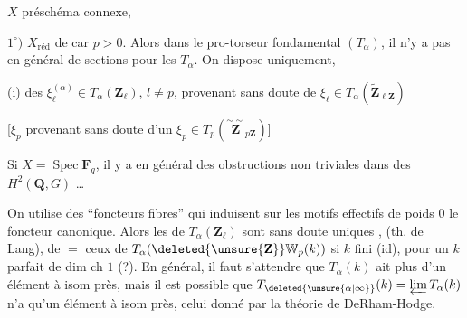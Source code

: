 $X$ préschéma connexe, 

$1^\circ)$ $X_{\mathrm{réd}}$ de car $p>0$. Alors dans le pro-torseur fondamental $(T_\alpha)$, il n'y a pas en général de sections pour les $T_\alpha$.  On dispose uniquement, 

(i) des $\xi_{\ell}^{(\alpha)}\in T_\alpha(\mathbf Z_{\ell})$, $l\ne p$, provenant sans doute de $\xi_{\ell}\in T_\alpha(\widetilde{\mathbf Z}_{\ell\mathbf Z})$


[$\xi_p$ provenant sans doute d'un $\xi_p\in T_p(\overset{\sim\!\sim}{\mathbf Z}_{p\mathbf Z})$]

Si $X=\operatorname{Spec}\mathbf F_q$, il y a en général des  obstructions non triviales dans des $H^2(\mathbf Q,G)$ \ldots

 On utilise des ``foncteurs fibres'' qui induisent sur les motifs effectifs de poids $0$ le foncteur canonique. Alors les  de $T_\alpha(\mathbf Z_\ell)$ sont sans doute uniques , (th. de Lang), de $=$ ceux de $T_\alpha(\deleted{\unsure{\mathbf Z}}\mathbb{W}_p(k))$ si $k$ fini (id),  pour un $k$ parfait de dim ch $1$ (?). En général, il faut s'attendre que $T_\alpha(k)$  ait plus d'un élément à isom près, mais il est possible que $T_{\deleted{\unsure{\alpha|\infty}}}(k)=\varprojlim T_\alpha(k)$ n'a qu'un élément à isom près, celui donné par la théorie de DeRham-Hodge.
